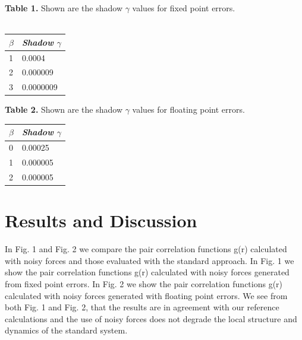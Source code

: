 \documentclass[aps,pre,twocolumn,showpacs,preprintnumbers,amsmath,amssymb]{revtex4-1}
\begin{document}
\textbf{Table 1.} Shown are the shadow \(\gamma\) values for fixed point errors. \\ \\
\begin{table}[h!]
\begin{tabular}{|l|l|}
\hline
\textit{\(\beta\) } & \textit{Shadow \(\gamma\)} \\ \hline
1             & 0.0004                \\ \hline
2             & 0.000009              \\ \hline
3             & 0.0000009             \\ \hline
\end{tabular}
\end{table}


\textbf{Table 2.} Shown are the shadow \(\gamma\) values for floating point errors.\\

\begin{table}[h!]
\begin{tabular}{|l|l|}
\hline
\textit{\(\beta\) } & \textit{Shadow \(\gamma\)} \\ \hline
0             & 0.00025               \\ \hline
1             & 0.000005              \\ \hline
2             & 0.000005              \\ \hline
\end{tabular}
\end{table}
 
\section{Results and Discussion}

 In Fig. 1 and Fig. 2 we compare the pair correlation functions g(r) calculated with noisy forces and those evaluated with the standard approach. In Fig. 1 we show the pair correlation functions g(r) calculated with noisy forces generated from fixed point errors. In Fig. 2 we show the pair correlation functions g(r) calculated with noisy forces generated with floating point errors. We see from both Fig. 1 and Fig. 2, that the results are in agreement with our reference calculations and the use of noisy forces does not degrade the local structure and dynamics of the standard system. 
\end{document}
